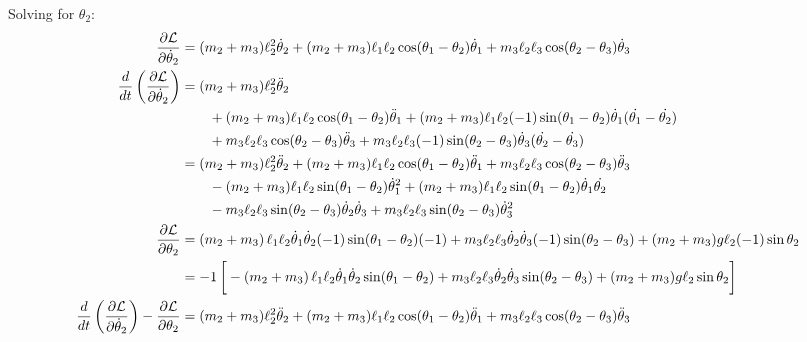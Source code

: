 \documentclass[letterpaper,8pt]{article}
\begin{document}
Solving for $\theta_2$:
\begin{align*}
\frac{\partial \mathcal{L}}{\partial \dot{\theta}_2} &= (m_2 + m_3) \ell_2^2 \dot{\theta}_2 
           + (m_2 + m_3) \ell_1 \ell_2 \cos (\theta_1 - \theta_2) \dot{\theta}_1
           + m_3 \ell_2 \ell_3 \cos (\theta_2 - \theta_3) \dot{\theta}_3 \\
\frac{d}{dt} \left( \frac{\partial \mathcal{L}}{\partial \dot{\theta}_2} \right) &= (m_2 + m_3) \ell_2^2 \ddot{\theta}_2 \\
& \qquad   + (m_2 + m_3) \ell_1 \ell_2 \cos (\theta_1 - \theta_2) \ddot{\theta}_1 
           + (m_2 + m_3) \ell_1 \ell_2 (-1)\sin (\theta_1 - \theta_2) \dot{\theta}_1 (\dot{\theta_1} - \dot{\theta_2}) \\
& \qquad   + m_3 \ell_2 \ell_3 \cos (\theta_2 - \theta_3) \ddot{\theta}_3 
           + m_3 \ell_2 \ell_3 (-1)\sin (\theta_2 - \theta_3) \dot{\theta}_3 (\dot{\theta_2} - \dot{\theta_3}) \\
&= (m_2 + m_3) \ell_2^2 \ddot{\theta}_2 + (m_2 + m_3) \ell_1 \ell_2 \cos (\theta_1 - \theta_2) \ddot{\theta}_1 + m_3 \ell_2 \ell_3 \cos (\theta_2 - \theta_3) \ddot{\theta}_3 \\
& \qquad   - (m_2 + m_3) \ell_1 \ell_2 \sin (\theta_1 - \theta_2) \dot{\theta}_1^2 + (m_2 + m_3) \ell_1 \ell_2 \sin (\theta_1 - \theta_2) \dot{\theta}_1\dot{\theta_2} \\
& \qquad   - m_3 \ell_2 \ell_3 \sin (\theta_2 - \theta_3) \dot{\theta}_2\dot{\theta}_3 + m_3 \ell_2 \ell_3 \sin (\theta_2 - \theta_3) \dot{\theta}_3^2 \\
\frac{\partial \mathcal{L}}{\partial \theta_2} &= \left( m_2 + m_3 \right) \ell_1\ell_2\dot{\theta}_1\dot{\theta}_2(-1)\sin (\theta_1 - \theta_2)(-1) 
            + m_3 \ell_2\ell_3\dot{\theta}_2\dot{\theta}_3 (-1)\sin(\theta_2 - \theta_3) 
            + (m_2 + m_3) g \ell_2 (-1)\sin \theta_2 \\
&= -1 \left[ \vphantom{\frac{1}{2}} -\left( m_2 + m_3 \right) \ell_1\ell_2\dot{\theta}_1\dot{\theta}_2\sin (\theta_1 - \theta_2)  
            + m_3 \ell_2\ell_3\dot{\theta}_2\dot{\theta}_3 \sin(\theta_2 - \theta_3)
            + (m_2 + m_3) g \ell_2 \sin \theta_2 \right] \\
\frac{d}{dt} \left( \frac{\partial \mathcal{L}}{\partial \dot{\theta}_2} \right) - \frac{\partial \mathcal{L}}{\partial \theta_2} &= 
(m_2 + m_3) \ell_2^2 \ddot{\theta}_2 + (m_2 + m_3) \ell_1 \ell_2 \cos (\theta_1 - \theta_2) \ddot{\theta}_1 + m_3 \ell_2 \ell_3 \cos (\theta_2 - \theta_3) \ddot{\theta}_3 \\

\end{align*}
\end{document}
